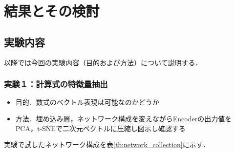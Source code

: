 \documentclass[a4j,11pt,report]{jsbook}
\begin{document}
\chapter{結果とその検討 \label{ch:result}}


\section{実験内容}
以降では今回の実験内容（目的および方法）について説明する．

\subsection{実験１：計算式の特徴量抽出}
\begin{itemize}
  \item 目的．数式のベクトル表現は可能なのかどうか
  \item 方法．埋め込み層，ネットワーク構成を変えながらEncoderの出力値をPCA，t-SNEで二次元ベクトルに圧縮し図示し確認する
\end{itemize}

実験で試したネットワーク構成を表\ref{tb:network_collection}に示す．
\end{document}

